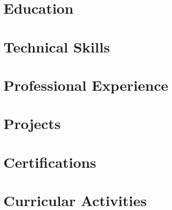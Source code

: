 \documentclass[10pt,a4paper,calibri]{moderncv}
\begin{document}
\makecvtitle{}
\vspace{-32pt}

\section{Education}


\section{Technical Skills}


\section{Professional Experience}


\section{Projects}


\section{Certifications}


\section{Curricular Activities}

\end{document}
